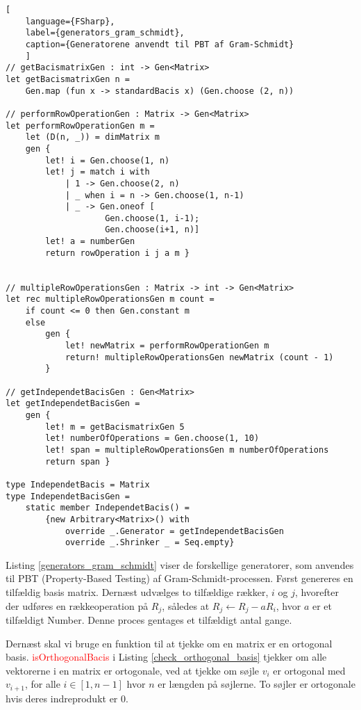 \begin{lstlisting}[
    language={FSharp}, 
    label={generators_gram_schmidt}, 
    caption={Generatorene anvendt til PBT af Gram-Schmidt}
    ]
// getBacismatrixGen : int -> Gen<Matrix>
let getBacismatrixGen n =
    Gen.map (fun x -> standardBacis x) (Gen.choose (2, n))

// performRowOperationGen : Matrix -> Gen<Matrix>
let performRowOperationGen m =
    let (D(n, _)) = dimMatrix m
    gen { 
        let! i = Gen.choose(1, n)
        let! j = match i with
            | 1 -> Gen.choose(2, n)
            | _ when i = n -> Gen.choose(1, n-1)
            | _ -> Gen.oneof [
                    Gen.choose(1, i-1); 
                    Gen.choose(i+1, n)]
        let! a = numberGen
        return rowOperation i j a m }


// multipleRowOperationsGen : Matrix -> int -> Gen<Matrix>
let rec multipleRowOperationsGen m count =
    if count <= 0 then Gen.constant m
    else
        gen {
            let! newMatrix = performRowOperationGen m
            return! multipleRowOperationsGen newMatrix (count - 1)
        }

// getIndependetBacisGen : Gen<Matrix>
let getIndependetBacisGen =
    gen { 
        let! m = getBacismatrixGen 5
        let! numberOfOperations = Gen.choose(1, 10)
        let! span = multipleRowOperationsGen m numberOfOperations
        return span }

type IndependetBacis = Matrix
type IndependetBacisGen =
    static member IndependetBacis() =
        {new Arbitrary<Matrix>() with
            override _.Generator = getIndependetBacisGen
            override _.Shrinker _ = Seq.empty}
\end{lstlisting}

Listing \ref{generators_gram_schmidt} viser de forskellige generatorer, som anvendes til PBT (Property-Based Testing) af Gram-Schmidt-processen. Først genereres en tilfældig basis matrix. Dernæst udvælges to tilfældige rækker, \(i\) og \(j\), hvorefter der udføres en rækkeoperation på \(R_j\), således at \(R_j \leftarrow R_j - aR_i\), hvor $a$ er et tilfældigt Number. Denne proces gentages et tilfældigt antal gange.

Dernæst skal vi bruge en funktion til at tjekke om en matrix er en ortogonal basis. \textcolor{red}{isOrthogonalBacis} i Listing \ref{check_orthogonal_basis} tjekker om alle vektorerne i en matrix er ortogonale, ved at tjekke om søjle $v_i$ er ortogonal med $v_{i+1}$, for alle $i \in [1, n-1]$ hvor $n$ er længden på søjlerne. To søjler er ortogonale hvis deres indreprodukt er 0.


